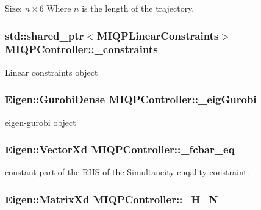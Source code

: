 \-Size\-: $n\times6$ \-Where $n$ is the length of the trajectory. \hypertarget{classMIQPController_affac62ccd729155720b16de3137ef3f5}{
\subsubsection[{\-\_\-constraints}]{\setlength{\rightskip}{0pt plus 5cm}std\-::shared\-\_\-ptr$<${\bf \-M\-I\-Q\-P\-Linear\-Constraints}$>$ {\bf \-M\-I\-Q\-P\-Controller\-::\-\_\-constraints}}}\label{classMIQPController_affac62ccd729155720b16de3137ef3f5}
\-Linear constraints object \hypertarget{classMIQPController_a6d15db521a6b9c4e0b641709fef77373}{
\subsubsection[{\-\_\-eig\-Gurobi}]{\setlength{\rightskip}{0pt plus 5cm}\-Eigen\-::\-Gurobi\-Dense {\bf \-M\-I\-Q\-P\-Controller\-::\-\_\-eig\-Gurobi}}}\label{classMIQPController_a6d15db521a6b9c4e0b641709fef77373}
eigen-\/gurobi object \hypertarget{classMIQPController_a338af9b8197f5b08f4e05f2e31342037}{
\subsubsection[{\-\_\-fcbar\-\_\-eq}]{\setlength{\rightskip}{0pt plus 5cm}\-Eigen\-::\-Vector\-Xd {\bf \-M\-I\-Q\-P\-Controller\-::\-\_\-fcbar\-\_\-eq}}}\label{classMIQPController_a338af9b8197f5b08f4e05f2e31342037}
constant part of the \-R\-H\-S of the \-Simultaneity euqality constraint. \hypertarget{classMIQPController_ab4b99d844add54fa7ad6ca6b80cab089}{
\subsubsection[{\-\_\-\-H\-\_\-\-N}]{\setlength{\rightskip}{0pt plus 5cm}\-Eigen\-::\-Matrix\-Xd {\bf \-M\-I\-Q\-P\-Controller\-::\-\_\-\-H\-\_\-\-N}}}\label{classMIQPController_ab4b99d844add54fa7ad6ca6b80cab089}
